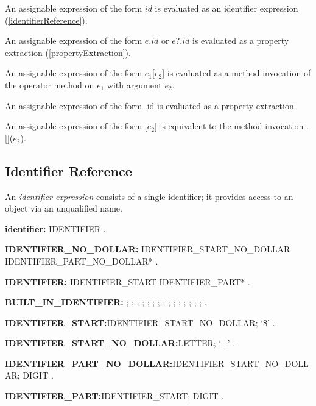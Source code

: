 \documentclass{article}
\newcommand{\code}[1]{{\sf #1}}
\begin{document}
\begin{itemize}
\LMHash{}
An assignable expression of the form $id$ is evaluated as an identifier expression (\ref{identifierReference}).


\LMHash{}
An assignable expression of the form $e.id$ or $e?.id$ is evaluated as a property extraction  (\ref{propertyExtraction}).

\LMHash{}
An assignable expression of the form \code{$e_1$[$e_2$]} is evaluated as a method invocation of the operator method \code{[]} on $e_1$ with argument $e_2$.

\LMHash{}
An assignable expression of the form \code{\SUPER{}.id}  is evaluated as a property extraction.

\LMHash{}
An assignable expression of the form \code{\SUPER{}[$e_2$]} is equivalent to the method invocation  \code{\SUPER{}.[]($e_2$)}.

\subsection{ Identifier Reference}

\LMHash{}
An {\em identifier expression} consists of a single identifier; it provides access to an object via an unqualified name.

\begin{grammar}
{\bf identifier:}
     IDENTIFIER
     .


 {\bf IDENTIFIER\_NO\_DOLLAR:}
      IDENTIFIER\_START\_NO\_DOLLAR IDENTIFIER\_PART\_NO\_DOLLAR*
    .

{\bf IDENTIFIER:}
      IDENTIFIER\_START IDENTIFIER\_PART*
    .

{\bf BUILT\_IN\_IDENTIFIER:} \ABSTRACT{};
     \AS{};
     \DEFERRED{};
     \DYNAMIC{};
     \EXPORT{};
     \EXTERNAL{};
     \FACTORY{};
     \GET{};
     \IMPLEMENTS{};
     \IMPORT{};
     \LIBRARY{};
     \OPERATOR{};
     \PART{};
      \SET{};
      \STATIC{};
     \TYPEDEF{}
    .

 {\bf IDENTIFIER\_START:}IDENTIFIER\_START\_NO\_DOLLAR;
      `\$'
    .

{\bf IDENTIFIER\_START\_NO\_DOLLAR:}LETTER;
      `\_'
    .

{\bf  IDENTIFIER\_PART\_NO\_DOLLAR:}IDENTIFIER\_START\_NO\_DOLLAR;
      DIGIT
    .


{\bf IDENTIFIER\_PART:}IDENTIFIER\_START;
      DIGIT
    .




\end{grammar}
\end{itemize}
\end{document}
